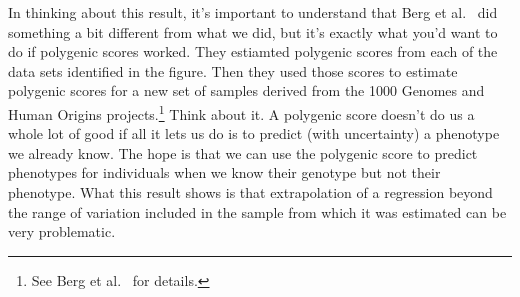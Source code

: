 In thinking about this result, it's important to understand that Berg
et al.~\cite{Berg-etal-2018} did something a bit different from what
we did, but it's exactly what you'd want to do if polygenic scores
worked. They estiamted polygenic scores from each of the data sets
identified in the figure. Then they used those scores to estimate
polygenic scores for a new set of samples derived from the 1000
Genomes and Human Origins projects.\footnote{See Berg et
  al.~\cite{Berg-etal-2018} for details.} Think about it. A polygenic
score doesn't do us a whole lot of good if all it lets us do is to
predict (with uncertainty) a phenotype we already know. The hope is
that we can use the polygenic score to predict phenotypes for
individuals when we know their genotype but not their phenotype. What
this result shows is that extrapolation of a regression beyond the
range of variation included in the sample from which it was estimated
can be very problematic.

